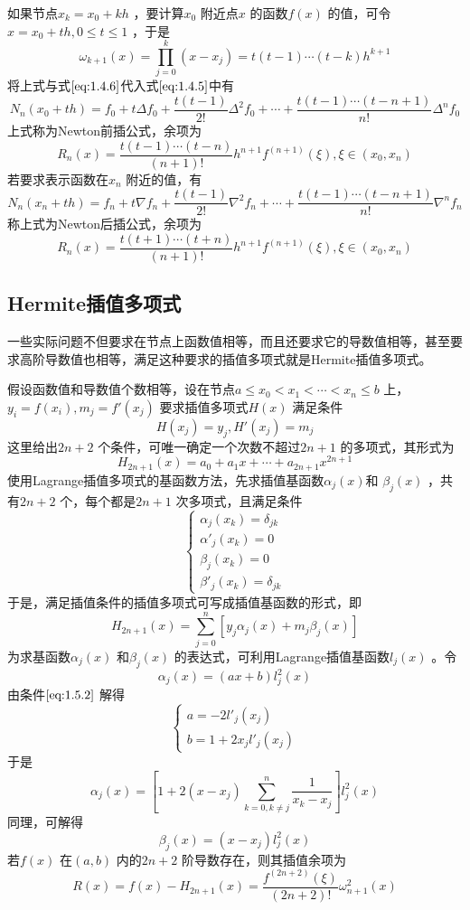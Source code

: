 \documentclass[a4paper]{article}
\begin{document}
如果节点$x_k = x_0 + k h$ ，要计算$x_0$ 附近点$x$ 的函数$f(x)$ 的值，可令$x = x_0 + t h, 0 \le t \le 1 $ ，于是
\[
	\omega_{k+1}(x) = \prod_{j=0}^{k} (x-x_{j}) = t(t-1)\cdots(t-k)h^{k+1} 
\] 
将上式与式$\ref{eq:1.4.6}$代入式$\ref{eq:1.4.5}$中有
\[
	N_n(x_0 + th) = f_0 + t \Delta f_0 + \frac{t(t-1)}{2!} \Delta^{2} f_0 + \cdots + \frac{t(t-1)\cdots(t-n+1)}{n!} \Delta^{n}f_0 \tag{1.4.8} \label{eq:1.4.8}
\]
上式称为Newton前插公式，余项为
\[
R_n(x) = \frac{t(t-1)\cdots(t-n)}{(n+1)!}h^{n+1}f^{(n+1)}(\xi), \xi \in (x_0, x_{n})
\] 
若要求表示函数在$x_{n}$ 附近的值，有
\[
	N_n(x_n + th) = f_n + t \nabla  f_n + \frac{t(t-1)}{2!} \nabla ^{2} f_n + \cdots + \frac{t(t-1)\cdots(t-n+1)}{n!} \nabla ^{n}f_n \tag{1.4.9} \label{eq:1.4.9}
\] 
称上式为Newton后插公式，余项为
\[
R_n(x) = \frac{t(t+1)\cdots(t+n)}{(n+1)!}h^{n+1}f^{(n+1)}(\xi), \xi \in (x_0, x_{n})
\] 
\subsection{Hermite插值多项式}
一些实际问题不但要求在节点上函数值相等，而且还要求它的导数值相等，甚至要求高阶导数值也相等，满足这种要求的插值多项式就是Hermite插值多项式。

假设函数值和导数值个数相等，设在节点$a \le x_0 < x_1 < \cdots < x_{n} \le b$ 上，$y_{i} = f(x_{i}), m_j = f'(x_{j})$ 要求插值多项式$H(x)$ 满足条件
\[
	H(x_{j}) = y_{j}, H'(x_{j}) = m_j \tag{1.5.1} \label{eq:1.5.1}
\] 
这里给出$2n + 2$ 个条件，可唯一确定一个次数不超过$2n + 1$ 的多项式，其形式为
\[
	H_{2n+1}(x) = a_0 + a_1 x + \cdots + a_{2n+1} x^{2n+1}
\] 
使用Lagrange插值多项式的基函数方法，先求插值基函数$\alpha_j(x)$和 $\beta_j(x)$ ，共有$2n+2$ 个，每个都是$2n+1$ 次多项式，且满足条件
\[
	\tag{1.5.2} \label{eq:1.5.2}
	\begin{cases}
		\alpha_j (x_{k}) = \delta_{jk} \\
        	\alpha'_j(x_{k}) = 0 \\
        	\beta_j(x_{k}) = 0 \\
        	\beta'_j(x_{k}) = \delta_{jk}
	\end{cases}	
\] 
于是，满足插值条件的插值多项式可写成插值基函数的形式，即
\[
	H_{2n+1}(x) = \sum_{j=0}^{n} [y_{j} \alpha_j(x) + m_j \beta_j (x)] \tag{1.5.3} \label{eq:1.5.3}
\] 
为求基函数$\alpha_j(x)$ 和$\beta_j (x)$ 的表达式，可利用Lagrange插值基函数$l_j(x)$ 。令
\[
\alpha_j (x) = (ax + b) l^{2}_j (x)
\] 
由条件$\ref{eq:1.5.2}$ 解得
\[
\begin{cases}
	a = -2 l'_j(x_{j}) \\
	b = 1 + 2 x_{j} l'_j (x_{j}) 
\end{cases}
\] 
于是
\[
	\alpha_j(x) = [1 + 2(x - x_{j}) \sum_{k=0,k \neq j}^{n} \frac{1}{x_{k} - x_{j}}] l^2_j(x)
\] 
同理，可解得
\[
	\beta_j(x) = (x - x_{j}) l^2_j (x)
\] 
若$f(x)$ 在$(a,b)$ 内的$2n+2$ 阶导数存在，则其插值余项为
\[
	R(x) = f(x) - H_{2n+1}(x) = \frac{f^{(2n+2)} (\xi)}{(2n+2)!} \omega^2_{n+1}(x) \tag{1.5.4} \label{eq:1.5.4}
\] 
\end{document}
